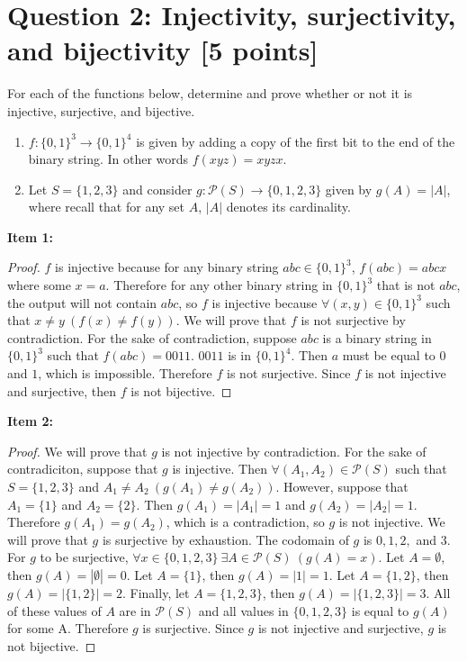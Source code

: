 \documentclass{report}
\theoremstyle{mytheoremstyle}
\theoremstyle{mytheoremstyle}
\theoremstyle{myproblemstyle}
\begin{document}
\section*{\Large{Question 2: Injectivity, surjectivity, and bijectivity [5 points]}}
For each of the functions below, determine and prove whether or not it is injective, surjective, and bijective.
\begin{enumerate}
    \item $f:\{0,1\}^3 \rightarrow \{0, 1\}^4$ is given by adding a copy of the first bit to the end of the binary string. In other words $f(xyz) = xyzx$.
    \item Let $S = \{1, 2, 3\}$ and consider $g: \mathcal{P}(S) \rightarrow \{0, 1, 2, 3\}$ given by $g(A) = |A|$, where recall that for any set $A$, $|A|$ denotes its cardinality.
\end{enumerate}
\textbf{Item 1:}
\begin{proof}
    $f$ is injective because for any binary string $abc \in \{0, 1\}^3$, $f(abc) = abcx$ where some $x = a$. Therefore for any other binary string in $\{0, 1\}^3$ that is not $abc$, the output will not contain $abc$, so $f$ is injective because $\forall (x,y) \in \{0,1\}^3$ such that $x \neq y \: (f(x) \neq f(y))$. We will prove that $f$ is not surjective by contradiction. For the sake of contradiction, suppose $abc$ is a binary string in $\{0, 1\}^3$ such that $f(abc) = 0011$. $0011$ is in $\{0, 1\}^4$. Then $a$ must be equal to $0$ and $1$, which is impossible. Therefore $f$ is not surjective. Since $f$ is not injective and surjective, then $f$ is not bijective.
\end{proof} 
\textbf{Item 2:}
\begin{proof}
    We will prove that $g$ is not injective by contradiction. For the sake of contradiciton, suppose that $g$ is injective. Then $\forall (A_1, A_2) \in \mathcal{P}(S)$ such that $S = \{1, 2, 3\}$ and $A_1 \neq A_2 \: (g(A_1) \neq g(A_2))$. However, suppose that $A_1 = \{1\}$ and $A_2 = \{2\}$. Then $g(A_1) = |A_1| = 1$ and $g(A_2) = |A_2| = 1$. Therefore $g(A_1) = g(A_2)$, which is a contradiction, so $g$ is not injective. We will prove that $g$ is surjective by exhaustion. The codomain of $g$ is $0, 1, 2,$ and $3$. For $g$ to be surjective, $\forall x \in \{0, 1, 2, 3\} \: \exists A \in \mathcal{P}(S) \: (g(A)=x)$. Let $A = \emptyset$, then $g(A) = |\emptyset| = 0$. Let $A = \{1\}$, then $g(A) = |{1}| = 1$. Let $A = \{1, 2\}$, then $g(A) = |\{1, 2\}| = 2.$ Finally, let $A = \{1, 2, 3\}$, then $g(A) = |\{1, 2, 3\}| = 3.$ All of these values of $A$ are in $\mathcal{P}(S)$ and all values in $\{0, 1, 2, 3\}$ is equal to $g(A)$ for some A. Therefore $g$ is surjective. Since $g$ is not injective and surjective, $g$ is not bijective.  
\end{proof}
\end{document}
